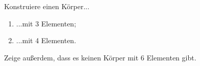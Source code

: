 \begin{prob}Konstruiere einen Körper...
  \begin{enumerate}[label=(\alph*)]
  \item ...mit 3 Elementen;
  \item ...mit 4 Elementen.
  \end{enumerate}
  Zeige außerdem, dass es keinen Körper mit 6 Elementen gibt.
\end{prob}
